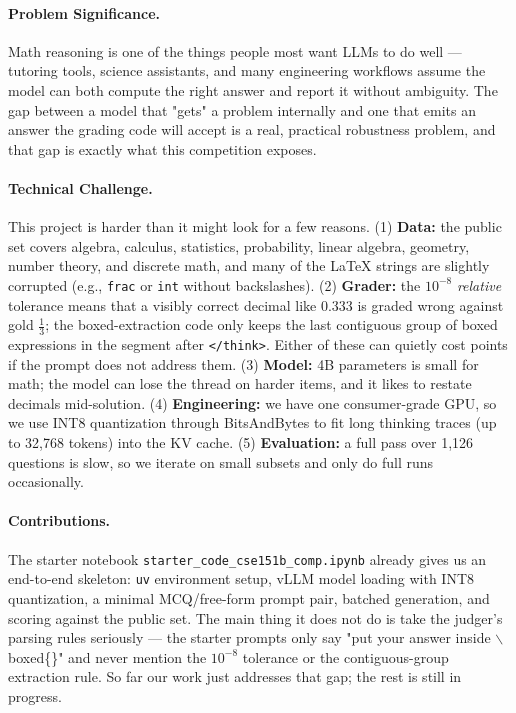 \documentclass{article}
\begin{document}
\paragraph{Problem Significance.}
Math reasoning is one of the things people most want LLMs to do
well --- tutoring tools, science assistants, and many engineering
workflows assume the model can both compute the right answer and
report it without ambiguity. The gap between a model that "gets"
a problem internally and one that emits an answer the grading code
will accept is a real, practical robustness problem, and that gap
is exactly what this competition exposes.

\paragraph{Technical Challenge.}
This project is harder than it might look for a few reasons.
(1) \textbf{Data:} the public set covers algebra, calculus,
statistics, probability, linear algebra, geometry, number theory, and
discrete math, and many of the LaTeX strings are slightly corrupted
(e.g., \texttt{frac} or \texttt{int} without backslashes).
(2) \textbf{Grader:} the $10^{-8}$ \emph{relative} tolerance means
that a visibly correct decimal like $0.333$ is graded wrong against
gold $\tfrac{1}{3}$; the boxed-extraction code only keeps the last
contiguous group of boxed expressions in the segment after
\texttt{</think>}. Either of these can quietly cost points if the
prompt does not address them. (3) \textbf{Model:} 4B parameters is
small for math; the model can lose the thread on harder items, and it
likes to restate decimals mid-solution.
(4) \textbf{Engineering:} we have one consumer-grade GPU, so we use
INT8 quantization through BitsAndBytes to fit long thinking traces
(up to 32{,}768 tokens) into the KV cache.
(5) \textbf{Evaluation:} a full pass over 1{,}126 questions is slow,
so we iterate on small subsets and only do full runs occasionally.

\paragraph{Contributions.}
The starter notebook \texttt{starter\_code\_cse151b\_comp.ipynb}
already gives us an end-to-end skeleton: \texttt{uv} environment
setup, vLLM model loading with INT8 quantization, a minimal
MCQ/free-form prompt pair, batched generation, and scoring against
the public set. The main thing it does not do is take the judger's
parsing rules seriously --- the starter prompts only say "put your
answer inside $\backslash$boxed\{\}" and never mention the
$10^{-8}$ tolerance or the contiguous-group extraction rule. So
far our work just addresses that gap; the rest is still in progress.
\end{document}
